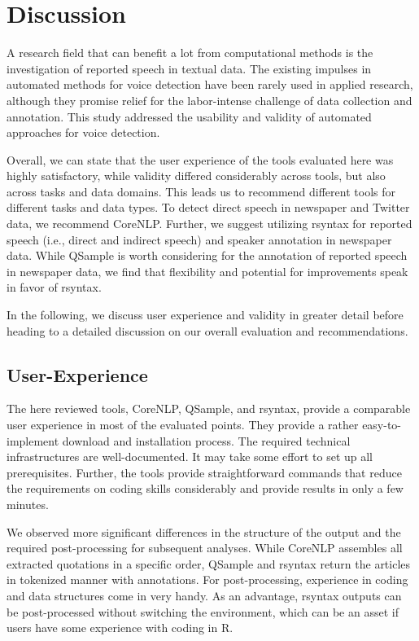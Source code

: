 \documentclass{ccr}
\begin{document}
\section{Discussion}

A research field that can benefit a lot from computational methods is
the investigation of reported speech in textual data. The existing
impulses in automated methods for voice detection have been rarely used
in applied research, although they promise relief for the labor-intense
challenge of data collection and annotation. This study addressed the
usability and validity of automated approaches for voice detection.

Overall, we can state that the user experience of the tools evaluated
here was highly satisfactory, while validity differed considerably
across tools, but also across tasks and data domains. This leads us to
recommend different tools for different tasks and data types. To detect
direct speech in newspaper and Twitter data, we recommend CoreNLP.
Further, we suggest utilizing rsyntax for reported speech (i.e., direct
and indirect speech) and speaker annotation in newspaper data. While
QSample is worth considering for the annotation of reported speech in
newspaper data, we find that flexibility and potential for improvements
speak in favor of rsyntax.

In the following, we discuss user experience and validity in greater
detail before heading to a detailed discussion on our overall evaluation
and recommendations.

\subsection{User-Experience}

The here reviewed tools, CoreNLP, QSample, and rsyntax, provide a
comparable user experience in most of the evaluated points. They provide
a rather easy-to-implement download and installation process. The
required technical infrastructures are well-documented. It may take some
effort to set up all prerequisites. Further, the tools provide straightforward commands that reduce the
requirements on coding skills considerably and provide results in only a
few minutes.

We observed more significant differences in the structure of the output
and the required post-processing for subsequent analyses. While CoreNLP assembles all extracted quotations in
a specific order, QSample and rsyntax return the articles in tokenized
manner with annotations. For post-processing, experience in coding and
data structures come in very handy. As an advantage, rsyntax outputs can
be post-processed without switching the environment, which can be an
asset if users have some experience with coding in R.
\end{document}
